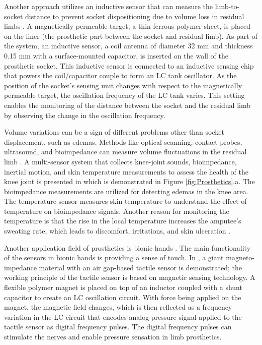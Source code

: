 Another approach utilizes an inductive sensor that can measure the limb-to-socket distance to prevent socket dispositioning due to volume loss in residual limbs \parencite{weathersby_thin_2019}. A magnetically permeable target, a thin ferrous polymer sheet, is placed on the liner (the prosthetic part between the socket and residual limb). As part of the system, an inductive sensor, a coil antenna of diameter 32 mm and thickness 0.15 mm with a surface-mounted capacitor, is inserted on the wall of the prosthetic socket. This inductive sensor is connected to an inductive sensing chip that powers the coil/capacitor couple to form an LC tank oscillator. As the position of the socket’s sensing unit changes with respect to the magnetically permeable target, the oscillation frequency of the LC tank varies. This setting enables the monitoring of the distance between the socket and the residual limb by observing the change in the oscillation frequency. 

Volume variations can be a sign of different problems other than socket displacement, such as edemas. Methods like optical scanning, contact probes, ultrasound, and bioimpedance can measure volume fluctuations in the residual limb \parencite{gupta_sensing_2020}. A multi-sensor system that collects knee-joint sounds, bioimpedance, inertial motion, and skin temperature measurements to assess the health of the knee joint is presented in \textcite{teague_wearable_2020} which is demonstrated in Figure \ref{fig:Prosthetics}.a. The bioimpedance measurements are utilized for detecting edemas in the knee area. The temperature sensor measures skin temperature to understand the effect of temperature on bioimpedance signals. Another reason for monitoring the temperature is that the rise in the local temperature increases the amputee's sweating rate, which leads to discomfort, irritations, and skin ulceration \parencite{gupta_sensing_2020}. 

Another application field of prosthetics is bionic hands \parencite{basumatary_state_2020}. The main functionality of the sensors in bionic hands is providing a sense of touch. %
In \textcite{wu_skin-inspired_2018}, a giant magneto-impedance material with an air gap-based tactile sensor is demonstrated; the working principle of the tactile sensor is based on magnetic sensing technology. A flexible polymer magnet is placed on top of an inductor coupled with a shunt capacitor to create an LC oscillation circuit. With force being applied on the magnet, the magnetic field changes, which is then reflected as a frequency variation in the LC circuit that encodes analog pressure signal applied to the tactile sensor as digital frequency pulses. The digital frequency pulses can stimulate the nerves and enable pressure sensation in limb prosthetics. 

